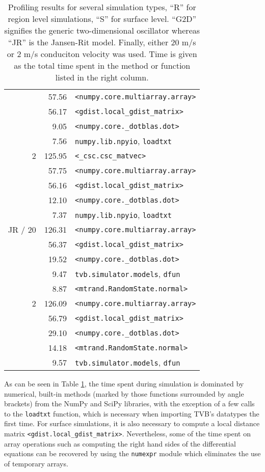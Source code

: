 \documentclass{bioinfo}
\begin{document}
\begin{table}
{\begin{tabular}{r | r | l }
	&         57.56& \texttt{<numpy.core.multiarray.array>} \\
	 &         56.17& \texttt{<gdist.local\_gdist\_matrix>} \\
	 &           9.05& \texttt{<numpy.core.\_dotblas.dot>} \\
	 &         7.56& \texttt{numpy.lib.npyio}, \texttt{loadtxt} \\
	\hline
	2 &         125.95& \texttt{<\_csc.csc\_matvec>} \\
	&         57.75& \texttt{<numpy.core.multiarray.array>} \\
	 &         56.16& \texttt{<gdist.local\_gdist\_matrix>} \\
	 &         12.10& \texttt{<numpy.core.\_dotblas.dot>} \\
	 &         7.37& \texttt{numpy.lib.npyio}, \texttt{loadtxt} \\
	\hline
	JR / 20 &         126.31& \texttt{<numpy.core.multiarray.array>} \\
	&         56.37& \texttt{<gdist.local\_gdist\_matrix>} \\
	 &         19.52& \texttt{<numpy.core.\_dotblas.dot>} \\
	 &         9.47& \texttt{tvb.simulator.models}, \texttt{dfun} \\
	 &         8.87& \texttt{<mtrand.RandomState.normal>} \\
	\hline
	2 &         126.09& \texttt{<numpy.core.multiarray.array>} \\
	&         56.79& \texttt{<gdist.local\_gdist\_matrix>} \\
	 &          29.10& \texttt{<numpy.core.\_dotblas.dot>} \\
	 &         14.18& \texttt{<mtrand.RandomState.normal>} \\
	 &         9.57& \texttt{tvb.simulator.models}, \texttt{dfun} \\
	\hline

	\end{tabular}}
	\caption{Profiling results for several simulation types, ``R'' for region 
	level simulations, ``S'' for surface level. ``G2D'' signifies the generic
	two-dimensional oscillator whereas ``JR'' is the Jansen-Rit model. Finally,
	either 20 m/s or 2 m/s conduciton velocity was used. Time is given as the
	total time spent in the method or function listed in the right column.}
	\label{tab:profiling}
	\end{table}


As can be seen in Table \ref{tab:profiling}, the time spent during simulation
is dominated by numerical, built-in methods (marked by those functions
surrounded by angle brackets) from the NumPy and SciPy libraries, with the
exception of a few calls to the \texttt{loadtxt} function, which is necessary
when importing TVB's datatypes the first time. For surface simulations, it is
also necessary to compute a local distance matrix
\texttt{<gdist.local\_gdist\_matrix>}. Nevertheless, some of the time spent on
array operations such as computing the right hand sides of the differential
equations can be recovered by using the \texttt{numexpr} module which
eliminates the use of temporary arrays. 
\end{document}
